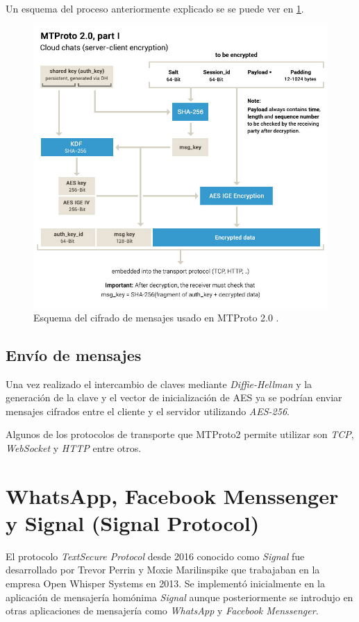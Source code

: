 Un esquema del proceso anteriormente explicado se se puede ver en \ref{mtproto2}.
\begin{figure}[htb]
	\centering
	\includegraphics[scale=0.4]{imagenes/diagramaMTProto.jpg} 
	\caption{Esquema del cifrado de mensajes usado en MTProto 2.0 \cite{WebProto}.}
	\label{mtproto2}
\end{figure}

\subsection{Envío de mensajes}
Una vez realizado el intercambio de claves mediante \emph{Diffie-Hellman} y la generación de la clave y el vector de inicialización de AES ya se podrían enviar mensajes cifrados entre el cliente y el servidor utilizando \emph{AES-256}.

Algunos de los protocolos de transporte que MTProto2 permite utilizar son \emph{TCP}, \emph{WebSocket} y \emph{HTTP} entre otros.

\section{WhatsApp, Facebook Menssenger y Signal (Signal Protocol)}
El protocolo \emph{TextSecure Protocol} desde 2016 conocido como \emph{Signal} fue desarrollado por Trevor Perrin y Moxie Marilinspike que trabajaban en la empresa Open Whisper Systems en 2013. Se implementó inicialmente en la aplicación de mensajería homónima \emph{Signal} aunque posteriormente se introdujo en otras aplicaciones de mensajería como \emph{WhatsApp} y \emph{Facebook Menssenger}.

